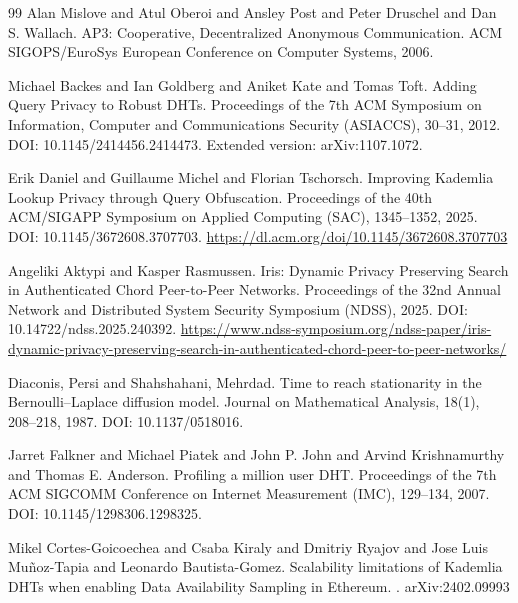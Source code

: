 \documentclass[11pt]{article}
\begin{document}
\begin{thebibliography}{99}
Alan Mislove and Atul Oberoi and Ansley Post and Peter Druschel and Dan S. Wallach.
\newblock AP3: Cooperative, Decentralized Anonymous Communication.
\newblock ACM SIGOPS/EuroSys European Conference on Computer Systems, 2006.

Michael Backes and Ian Goldberg and Aniket Kate and Tomas Toft.
\newblock Adding Query Privacy to Robust DHTs.
\newblock Proceedings of the 7th ACM Symposium on Information, Computer and Communications Security (ASIACCS), 30--31, 2012.
\newblock DOI: 10.1145/2414456.2414473.
\newblock Extended version: arXiv:1107.1072.

Erik Daniel and Guillaume Michel and Florian Tschorsch.
\newblock Improving {Kademlia} Lookup Privacy through Query Obfuscation.
\newblock Proceedings of the 40th {ACM}/{SIGAPP} Symposium on Applied Computing (SAC), 1345--1352, 2025.
\newblock DOI: 10.1145/3672608.3707703.
\newblock \url{https://dl.acm.org/doi/10.1145/3672608.3707703}

Angeliki Aktypi and Kasper Rasmussen.
\newblock Iris: Dynamic Privacy Preserving Search in Authenticated Chord Peer-to-Peer Networks.
\newblock Proceedings of the 32nd Annual Network and Distributed System Security Symposium (NDSS), 2025.
\newblock DOI: 10.14722/ndss.2025.240392.
\newblock \url{https://www.ndss-symposium.org/ndss-paper/iris-dynamic-privacy-preserving-search-in-authenticated-chord-peer-to-peer-networks/}

Diaconis, Persi and Shahshahani, Mehrdad.
\newblock Time to reach stationarity in the {B}ernoulli--{L}aplace diffusion model.
 Journal on Mathematical Analysis, 18(1), 208--218, 1987.
\newblock DOI: 10.1137/0518016.

Jarret Falkner and Michael Piatek and John P. John and Arvind Krishnamurthy and Thomas E. Anderson.
\newblock Profiling a million user DHT.
\newblock Proceedings of the 7th ACM SIGCOMM Conference on Internet Measurement (IMC), 129--134, 2007.
\newblock DOI: 10.1145/1298306.1298325.

Mikel Cortes-Goicoechea and Csaba Kiraly and Dmitriy Ryajov and Jose Luis Mu{\~n}oz-Tapia and Leonardo Bautista-Gomez.
\newblock Scalability limitations of Kademlia DHTs when enabling Data Availability Sampling in Ethereum.
.
\newblock arXiv:2402.09993


\end{thebibliography}
\end{document}
